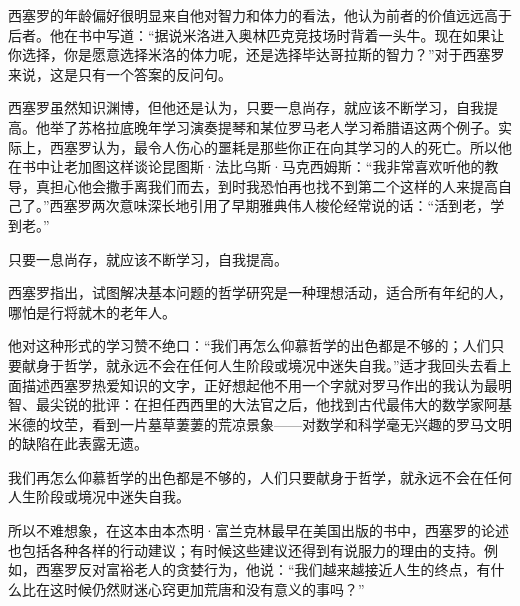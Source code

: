 西塞罗的年龄偏好很明显来自他对智力和体力的看法，他认为前者的价值远远高于后者。他在书中写道：“据说米洛进入奥林匹克竞技场时背着一头牛。现在如果让你选择，你是愿意选择米洛的体力呢，还是选择毕达哥拉斯的智力？”对于西塞罗来说，这是只有一个答案的反问句。
\par

西塞罗虽然知识渊博，但他还是认为，只要一息尚存，就应该不断学习，自我提高。他举了苏格拉底晚年学习演奏提琴和某位罗马老人学习希腊语这两个例子。实际上，西塞罗认为，最令人伤心的噩耗是那些你正在向其学习的人的死亡。所以他在书中让老加图这样谈论昆图斯·法比乌斯·马克西姆斯：“我非常喜欢听他的教导，真担心他会撒手离我们而去，到时我恐怕再也找不到第二个这样的人来提高自己了。”西塞罗两次意味深长地引用了早期雅典伟人梭伦经常说的话：“活到老，学到老。”
\par

\begin{WisdomBox}
\par

只要一息尚存，就应该不断学习，自我提高。
\par
\end{WisdomBox}

西塞罗指出，试图解决基本问题的哲学研究是一种理想活动，适合所有年纪的人，哪怕是行将就木的老年人。
\par

他对这种形式的学习赞不绝口：“我们再怎么仰慕哲学的出色都是不够的；人们只要献身于哲学，就永远不会在任何人生阶段或境况中迷失自我。”适才我回头去看上面描述西塞罗热爱知识的文字，正好想起他不用一个字就对罗马作出的我认为最明智、最尖锐的批评：在担任西西里的大法官之后，他找到古代最伟大的数学家阿基米德的坟茔，看到一片墓草萋萋的荒凉景象——对数学和科学毫无兴趣的罗马文明的缺陷在此表露无遗。
\par

\begin{WisdomBox}
\par

我们再怎么仰慕哲学的出色都是不够的，人们只要献身于哲学，就永远不会在任何人生阶段或境况中迷失自我。
\par
\end{WisdomBox}

所以不难想象，在这本由本杰明·富兰克林最早在美国出版的书中，西塞罗的论述也包括各种各样的行动建议；有时候这些建议还得到有说服力的理由的支持。例如，西塞罗反对富裕老人的贪婪行为，他说：“我们越来越接近人生的终点，有什么比在这时候仍然财迷心窍更加荒唐和没有意义的事吗？”
\par

